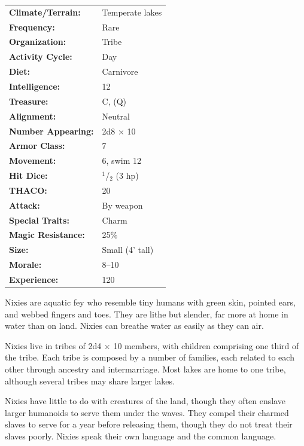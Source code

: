 \begin{multicols}{2}
\begin{minipage}{\columnwidth}
\noindent \begin{tabular}{p{}p{}}
\textbf{Climate/Terrain:}	& Temperate lakes	\\
\textbf{Frequency:} 		& Rare	\\
\textbf{Organization:} 		& Tribe	\\
\textbf{Activity Cycle:} 	& Day	\\
\textbf{Diet:} 				& Carnivore	\\
\textbf{Intelligence:} 		& 12	\\
\textbf{Treasure:} 			& C, (Q)	\\
\textbf{Alignment:} 		& Neutral	\\
\hline
\textbf{Number Appearing:} 	& 2d8 $\times$ 10	\\
\textbf{Armor Class:} 		& 7	\\
\textbf{Movement:} 			& 6, swim 12	\\
\textbf{Hit Dice:} 			& $^1$/$_2$	(3 hp)	\\
\textbf{THACO:} 			& 20	\\
\textbf{Attack:} 			& By weapon	\\
\textbf{Special Traits:} & Charm	\\
\textbf{Magic Resistance:} 	& 25\%	\\
\textbf{Size:} 				& Small (4' tall)	\\
\textbf{Morale:} 			& 8--10	\\
\textbf{Experience:} 		& 120	\\
\end{tabular}

\end{minipage}

Nixies are aquatic fey who resemble tiny humans with green skin, pointed ears, and webbed fingers and toes. They are lithe but slender, far more at home in water than on land. Nixies can breathe water as easily as they can air.

Nixies live in tribes of 2d4 $\times$ 10 members, with children comprising one third of the tribe. Each tribe is composed by a number of families, each related to each other through ancestry and intermarriage. Most lakes are home to one tribe, although several tribes may share larger lakes. 

Nixies have little to do with creatures of the land, though they often enslave larger humanoids to serve them under the waves. They compel their charmed slaves to serve for a year before releasing them, though they do not treat their slaves poorly. Nixies speak their own language and the common language.


\end{multicols}
